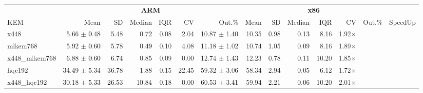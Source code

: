 \begin{table}[!ht]
\centering
\begin{tabular}{l|rrrrrr|rrrrrr|r}
\toprule
& \multicolumn{6}{c}{\bfseries ARM} & \multicolumn{6}{c}{\bfseries x86} & \\
\cmidrule(lr){2-7} \cmidrule(lr){8-13}
KEM & Mean & SD & Median & IQR & CV & Out.\% & Mean & SD & Median & IQR & CV & Out.\% & SpeedUp \\
\midrule
x448 			& 5.66 	$\pm$ 0.48 & 5.48 & 0.72 & 0.08 & 2.04 & 10.87 $\pm$ 1.40 & 10.35 & 0.98 & 0.13 & 8.16 & 1.92× \\
mlkem768 		& 5.92 	$\pm$ 0.60 & 5.78 & 0.49 & 0.10 & 4.08 & 11.18 $\pm$ 1.02 & 10.74 & 1.05 & 0.09 & 8.16 & 1.89× \\
x448_mlkem768 	& 6.88 	$\pm$ 0.60 & 6.74 & 0.85 & 0.09 & 0.00 & 12.74 $\pm$ 1.43 & 12.23 & 0.78 & 0.11 & 10.20 & 1.85× \\
hqc192 			& 34.49 $\pm$ 5.34 & 36.78 & 1.88 & 0.15 & 22.45 & 59.32 $\pm$ 3.06 & 58.34 & 2.94 & 0.05 & 6.12 & 1.72× \\
x448_hqc192 	& 30.18 $\pm$ 5.33 & 26.53 & 10.84 & 0.18 & 0.00 & 60.53 $\pm$ 3.41 & 59.94 & 2.21 & 0.06 & 10.20 & 2.01× \\
\bottomrule
\end{tabular}
\end{table}
